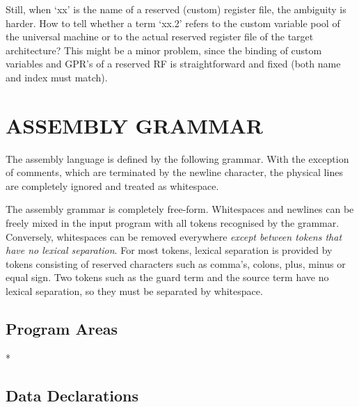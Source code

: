 \documentclass[twoside]{tce}
\begin{document}
Still, when `xx' is the name of a reserved (custom) register file, the
ambiguity is harder. How to tell whether a term `xx.2' refers to the custom
variable pool of the universal machine or to the actual reserved register
file of the target architecture? This might be a minor problem, since the
binding of custom variables and GPR's of a reserved RF is straightforward
and fixed (both name and index must match).



\appendix



\chapter{ASSEMBLY GRAMMAR}

The assembly language is defined by the following grammar. With the
exception of comments, which are terminated by the newline character, the
physical lines are completely ignored and treated as whitespace.

The assembly grammar is completely free-form.
%
Whitespaces and newlines can be freely mixed in the input program with all
tokens recognised by the grammar. Conversely, whitespaces can be removed
everywhere \emph{except between tokens that have no lexical separation}. For
most tokens, lexical separation is provided by tokens consisting of reserved
characters such as comma's, colons, plus, minus or equal sign. Two tokens
such as the guard term and the source term have no lexical separation, so
they must be separated by whitespace.

\section{Program Areas}

\begin{grammar}

    *

     \gror {}

     

     

\end{grammar}

\section{Data Declarations}
\end{document}
